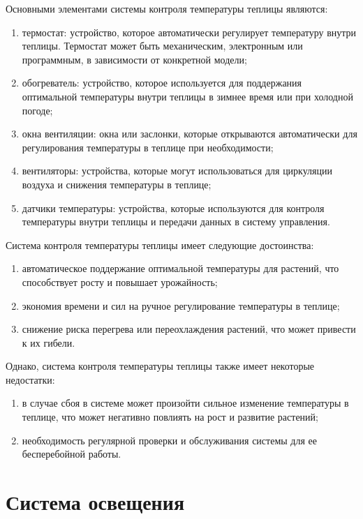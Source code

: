 Основными элементами системы контроля температуры теплицы являются:

\begin{enumerate}
    \item термостат: устройство, которое автоматически регулирует температуру внутри теплицы. Термостат может быть механическим, электронным или программным, в зависимости от конкретной модели;
    \item обогреватель: устройство, которое используется для поддержания оптимальной температуры внутри теплицы в зимнее время или при холодной погоде;
    \item окна вентиляции: окна или заслонки, которые открываются автоматически для регулирования температуры в теплице при необходимости;
    \item вентиляторы: устройства, которые могут использоваться для циркуляции воздуха и снижения температуры в теплице;
    \item датчики температуры: устройства, которые используются для контроля температуры внутри теплицы и передачи данных в систему управления.
\end{enumerate}

Система контроля температуры теплицы имеет следующие достоинства:

\begin{enumerate}
    \item автоматическое поддержание оптимальной температуры для растений, что способствует росту и повышает урожайность;
    \item экономия времени и сил на ручное регулирование температуры в теплице;
    \item снижение риска перегрева или переохлаждения растений, что может привести к их гибели.
\end{enumerate}

Однако, система контроля температуры теплицы также имеет некоторые недостатки:

\begin{enumerate}
    \item в случае сбоя в системе может произойти сильное изменение температуры в теплице, что может негативно повлиять на рост и развитие растений;
    \item необходимость регулярной проверки и обслуживания системы для ее бесперебойной работы.
\end{enumerate}

\section{Система освещения}

